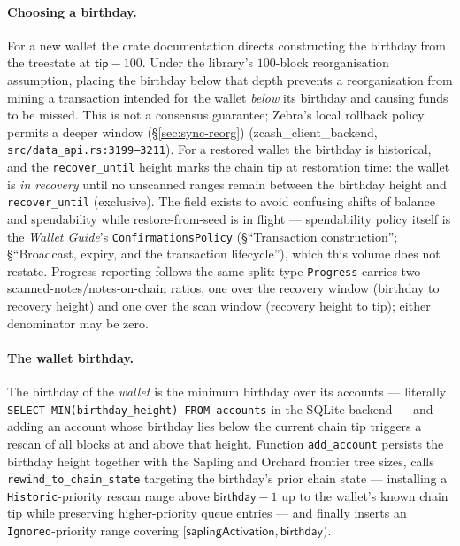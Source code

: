 \documentclass[11pt,a4paper]{article}
\theoremstyle{definition}
\begin{document}
\paragraph{Choosing a birthday.} For a new wallet the crate documentation
directs constructing the birthday from the treestate at
$\mathsf{tip} - 100$. Under the library's $100$-block reorganisation
assumption, placing the birthday below that depth prevents a reorganisation
from mining a transaction intended for the wallet \emph{below} its birthday
and causing funds to be missed. This is not a consensus guarantee; Zebra's
local rollback policy permits a deeper window (\S\ref{sec:sync-reorg})
(\textsf{zcash\_client\_backend}, \texttt{src/data\_api.rs:3199--3211}). For a
restored wallet the birthday is historical, and the \texttt{recover\_until}
height marks the chain tip at restoration time: the wallet is \emph{in
recovery} until no unscanned ranges remain between the birthday height and
\texttt{recover\_until} (exclusive). The field exists to avoid confusing
shifts of balance and spendability while restore-from-seed is in flight ---
spendability policy itself is the \emph{Wallet Guide}'s
\texttt{ConfirmationsPolicy} (\S``Transaction construction'';
\S``Broadcast, expiry, and the transaction lifecycle''), which this volume
does not restate. Progress reporting follows the same split: type
\texttt{Progress} carries two scanned-notes/notes-on-chain ratios, one over
the recovery window (birthday to recovery height) and one over the scan
window (recovery height to tip); either denominator may be zero.

\paragraph{The wallet birthday.} The birthday of the \emph{wallet} is the
minimum birthday over its accounts --- literally
\texttt{SELECT MIN(birthday\_height) FROM accounts} in the SQLite backend
--- and adding an account whose birthday lies below the current chain tip
triggers a rescan of all blocks at and above that height. Function
\texttt{add\_account} persists the birthday height together with the
Sapling and Orchard frontier tree sizes, calls
\texttt{rewind\_to\_chain\_state} targeting the birthday's prior chain
state --- installing a \texttt{Historic}-priority rescan range above
$\mathsf{birthday} - 1$ up to the wallet's known chain tip while preserving
higher-priority queue entries --- and finally inserts an
\texttt{Ignored}-priority range covering
$[\mathsf{saplingActivation}, \mathsf{birthday})$.
\end{document}
